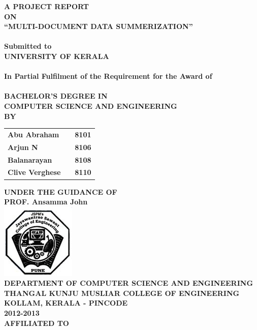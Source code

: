 \newpage
\begin{center}
\thispagestyle{empty}
\Large{\textbf{A PROJECT REPORT\\ON}}\\[0.2cm]
\Large{\textsc {\textbf{``MULTI-DOCUMENT DATA SUMMERIZATION''}}}\\
\Large{\textbf{\\Submitted to}}
\LARGE{\textbf{\\UNIVERSITY OF KERALA\\}}
\large{\textbf{\\In Partial Fulfilment of the Requirement for the Award of\\}}
\LARGE{\textbf{\\BACHELOR'S DEGREE IN\\COMPUTER SCIENCE AND ENGINEERING}}
\vspace{0.1cm}
\Large{\textbf{\\BY}}\\[0.2cm]
\begin{table}[h]
\centering
\Large{
\begin{tabular}{>{\bfseries}lc>{\bfseries}r}
Abu Abraham & & 8101\\Arjun N & & 8106\\Balanarayan & & 8108\\Clive Verghese & & 8110\\
\end{tabular}}
\end{table}
\large{\textbf{UNDER THE GUIDANCE OF}}\\
\large{\textbf{PROF. Ansamma John}}\\[0.5cm]
\includegraphics[scale=0.5]{project/images/jscoe_logo}\\
\large{\textbf{DEPARTMENT OF COMPUTER SCIENCE AND ENGINEERING}}\\
\Large{\textbf{THANGAL KUNJU MUSLIAR COLLEGE OF ENGINEERING}}\\
\large{\textbf{KOLLAM, KERALA - PINCODE}}
\large{\textbf{\\2012-2013}}\\[0.5cm]
\Large{\textbf{AFFILIATED TO}}\\[0.5cm]

\end{center}
